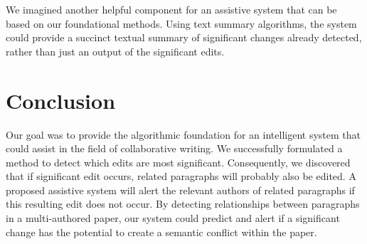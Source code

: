 We imagined another helpful component for an assistive system that can
be based on our foundational methods. Using text summary algorithms, the
system could provide a succinct textual summary of significant changes
already detected, rather than just an output of the significant edits.

\section{Conclusion}\label{conclusion}

Our goal was to provide the algorithmic foundation for an intelligent
system that could assist in the field of collaborative writing. We
successfully formulated a method to detect which edits are most
significant. Consequently, we discovered that if significant edit
occurs, related paragraphs will probably also be edited. A proposed
assistive system will alert the relevant authors of related paragraphs
if this resulting edit does not occur. By detecting relationships
between paragraphs in a multi-authored paper, our system could predict
and alert if a significant change has the potential to create a semantic
conflict within the paper.
